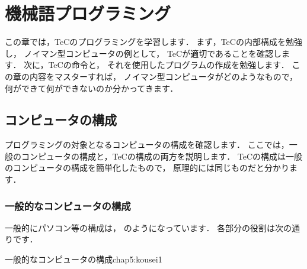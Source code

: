 \renewcommand{\myincludegraphics}[2]{\texttt{[image: chap5/\#1]}}

\chapter{機械語プログラミング\label{prog1}}

この章では，TeCのプログラミングを学習します．
まず，TeCの内部構成を勉強し，
ノイマン型コンピュータの例として，
TeCが適切であることを確認します．
次に，TeCの命令と，
それを使用したプログラムの作成を勉強します．
この章の内容をマスターすれば，
ノイマン型コンピュータがどのようなもので，
何ができて何ができないのか分かってきます．

\section{コンピュータの構成}

プログラミングの対象となるコンピュータの構成を確認します．
ここでは，一般のコンピュータの構成と，TeCの構成の両方を説明します．
TeCの構成は一般のコンピュータの構成を簡単化したもので，
原理的には同じものだと分かります．

\subsection{一般的なコンピュータの構成}

一般的にパソコン等の構成は，
のようになっています．
各部分の役割は次の通りです．

{一般的なコンピュータの構成}{chap5:kousei1}

